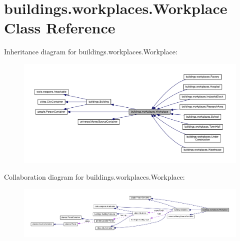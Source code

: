 \hypertarget{classbuildings_1_1workplaces_1_1_workplace}{}\section{buildings.\+workplaces.\+Workplace Class Reference}
\label{classbuildings_1_1workplaces_1_1_workplace}


Inheritance diagram for buildings.\+workplaces.\+Workplace\+:\nopagebreak
\begin{figure}[H]
\begin{center}
\leavevmode
\includegraphics[width=350pt]{classbuildings_1_1workplaces_1_1_workplace__inherit__graph}
\end{center}
\end{figure}


Collaboration diagram for buildings.\+workplaces.\+Workplace\+:\nopagebreak
\begin{figure}[H]
\begin{center}
\leavevmode
\includegraphics[width=350pt]{classbuildings_1_1workplaces_1_1_workplace__coll__graph}
\end{center}
\end{figure}

